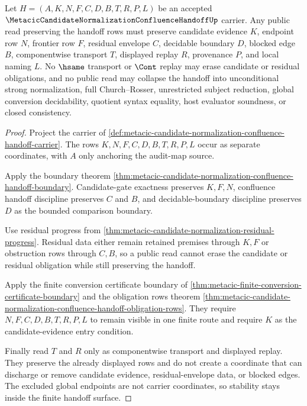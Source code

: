\begin{theorem}
\label{thm:metacic-candidate-normalization-handoff-obligation-stability}
Let $H=(A,K,N,F,C,D,B,T,R,P,L)$ be an accepted $\MetacicCandidateNormalizationConfluenceHandoffUp$ carrier. Any public read preserving the handoff rows must preserve candidate evidence $K$, endpoint row $N$, frontier row $F$, residual envelope $C$, decidable boundary $D$, blocked edge $B$, componentwise transport $T$, displayed replay $R$, provenance $P$, and local naming $L$. No $\hsame$ transport or $\Cont$ replay may erase candidate or residual obligations, and no public read may collapse the handoff into unconditional strong normalization, full Church--Rosser, unrestricted subject reduction, global conversion decidability, quotient syntax equality, host evaluator soundness, or closed consistency.
\end{theorem}
\begin{proof}
Project the carrier of \autoref{def:metacic-candidate-normalization-confluence-handoff-carrier}. The rows $K,N,F,C,D,B,T,R,P,L$ occur as separate coordinates, with $A$ only anchoring the audit-map source.

Apply the boundary theorem \autoref{thm:metacic-candidate-normalization-confluence-handoff-boundary}. Candidate-gate exactness preserves $K,F,N$, confluence handoff discipline preserves $C$ and $B$, and decidable-boundary discipline preserves $D$ as the bounded comparison boundary.

Use residual progress from \autoref{thm:metacic-candidate-normalization-residual-progress}. Residual data either remain retained premises through $K,F$ or obstruction rows through $C,B$, so a public read cannot erase the candidate or residual obligation while still preserving the handoff.

Apply the finite conversion certificate boundary of \autoref{thm:metacic-finite-conversion-certificate-boundary} and the obligation rows theorem \autoref{thm:metacic-candidate-normalization-confluence-handoff-obligation-rows}. They require $N,F,C,D,B,T,R,P,L$ to remain visible in one finite route and require $K$ as the candidate-evidence entry condition.

Finally read $T$ and $R$ only as componentwise transport and displayed replay. They preserve the already displayed rows and do not create a coordinate that can discharge or remove candidate evidence, residual-envelope data, or blocked edges. The excluded global endpoints are not carrier coordinates, so stability stays inside the finite handoff surface.
\end{proof}

